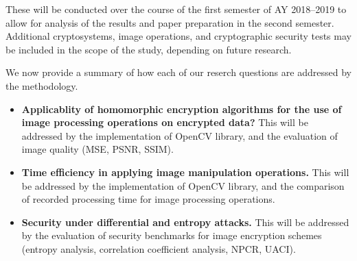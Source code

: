These will be conducted over the course of the first semester of AY 2018--2019 to allow for analysis of the results and paper preparation in the second semester. Additional cryptosystems, image operations, and cryptographic security tests may be included in the scope of the study, depending on future research.

We now provide a summary of how each of our reserch questions are addressed by the methodology.
\begin{itemize}
	\item \textbf{Applicablity of homomorphic encryption algorithms for the use of image processing operations on encrypted data?} This will be addressed by the implementation of OpenCV library, and the evaluation of image quality (MSE, PSNR, SSIM).
	\item \textbf{Time efficiency in applying image manipulation operations.} This will be addressed by the implementation of OpenCV library, and the comparison of recorded processing time for image processing operations.
	\item \textbf{Security under differential and entropy attacks.}
	This will be addressed by the evaluation of security benchmarks for image encryption schemes (entropy analysis, correlation coefficient analysis, NPCR, UACI).
\end{itemize}
